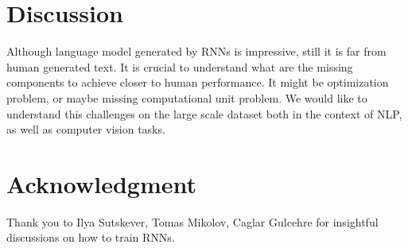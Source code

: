 \documentclass{article}
\begin{document}
\section{Discussion}
Although language model generated by RNNs is impressive, still it is far from
human generated text. It is crucial to understand what are the missing components
to achieve closer to human performance. It might be optimization problem, or
maybe missing computational unit problem. We would like to understand this challenges
on the large scale dataset both in the context of NLP, as well as computer vision tasks.


\section{Acknowledgment}
Thank you to Ilya Sutskever, Tomas Mikolov, Caglar Gulcehre for insightful discussions on how to train RNNs.



\end{document}
